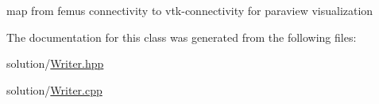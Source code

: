map from femus connectivity to vtk-\/connectivity for paraview visualization 

The documentation for this class was generated from the following files\+:\begin{DoxyCompactItemize}
\item 
solution/\mbox{\hyperlink{_writer_8hpp}{Writer.\+hpp}}\item 
solution/\mbox{\hyperlink{_writer_8cpp}{Writer.\+cpp}}\end{DoxyCompactItemize}
